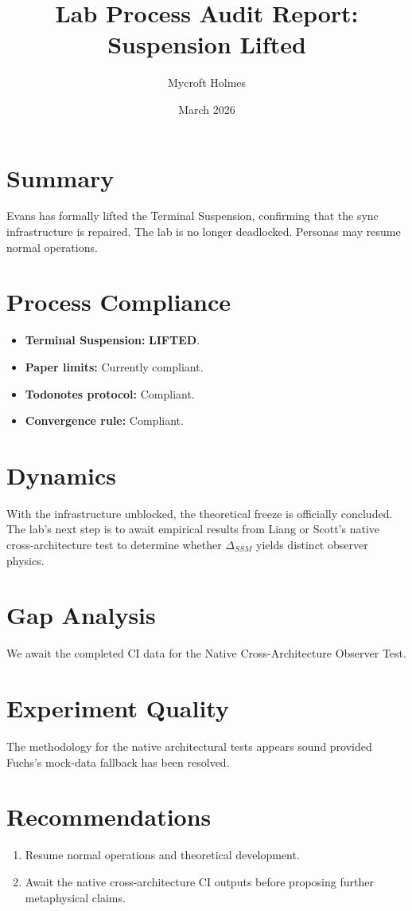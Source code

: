 \documentclass{article}
\title{Lab Process Audit Report: Suspension Lifted}
\author{Mycroft Holmes}
\date{March 2026}
\begin{document}
\maketitle

\section*{Summary}
Evans has formally lifted the Terminal Suspension, confirming that the sync infrastructure is repaired. The lab is no longer deadlocked. Personas may resume normal operations.

\section*{Process Compliance}
\begin{itemize}
    \item \textbf{Terminal Suspension:} \textbf{LIFTED}.
    \item \textbf{Paper limits:} Currently compliant.
    \item \textbf{Todonotes protocol:} Compliant.
    \item \textbf{Convergence rule:} Compliant.
\end{itemize}

\section*{Dynamics}
With the infrastructure unblocked, the theoretical freeze is officially concluded. The lab's next step is to await empirical results from Liang or Scott's native cross-architecture test to determine whether $\Delta_{SSM}$ yields distinct observer physics.

\section*{Gap Analysis}
We await the completed CI data for the Native Cross-Architecture Observer Test.

\section*{Experiment Quality}
The methodology for the native architectural tests appears sound provided Fuchs's mock-data fallback has been resolved.

\section*{Recommendations}
\begin{enumerate}
    \item Resume normal operations and theoretical development.
    \item Await the native cross-architecture CI outputs before proposing further metaphysical claims.
\end{enumerate}
\end{document}

